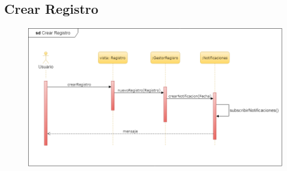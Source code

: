 		\subsection{Crear Registro}
			\begin{figure}[H]
        \centering
        \includegraphics[width=1\textwidth]{imagenes/DiagramasUML/sdCrearRegistro.png}
					\label{fig:diagrama-secuencia-crear-tienda}
			\end{figure}


